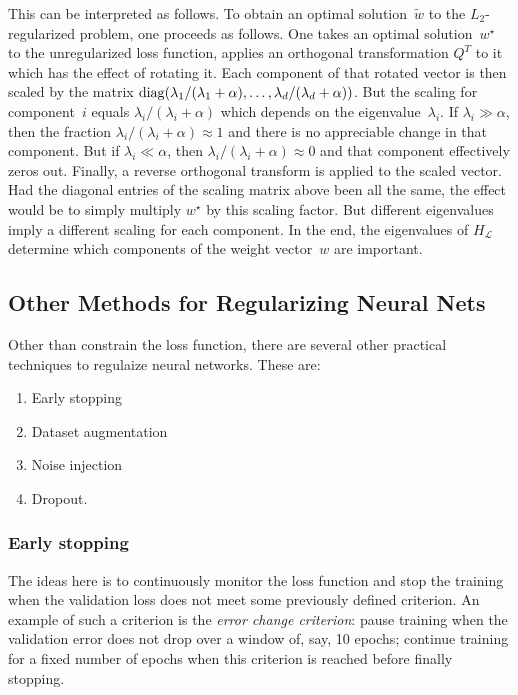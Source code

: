 This can be interpreted as follows. To obtain an optimal solution~$\tilde{w}$ to 
the $L_2$-regularized problem, one proceeds as follows. One takes an optimal solution~$w^{\star}$ 
to the unregularized loss function, applies an orthogonal transformation $Q^{T}$ 
to it which has the effect of rotating it. Each component of that rotated vector 
is then scaled by the matrix 
$\operatorname{diag}(\lambda_1 / (\lambda_1 + \alpha), \ldots, \lambda_d / (\lambda_d + \alpha))$. But 
the scaling for component~$i$ equals $\lambda_i / (\lambda_i + \alpha)$ which 
depends on the eigenvalue~$\lambda_i$. If $\lambda_i \gg \alpha$, then the 
fraction $\lambda_i / (\lambda_i + \alpha) \approx 1$ and there 
is no appreciable change in that component. But if $\lambda_i \ll \alpha$, then 
$\lambda_i / (\lambda_i + \alpha) \approx 0$ and that component effectively zeros 
out. Finally, a reverse orthogonal transform is applied to the scaled 
vector. Had the diagonal entries of the scaling matrix above been all the same, 
the effect would be to simply multiply $w^{\star}$ by this scaling factor. But 
different eigenvalues imply a different scaling for each component. 
In the end, the eigenvalues of $H_{\mathscr{L}}$ determine which components 
of the weight vector~$w$ are important.

\subsection{Other Methods for Regularizing Neural Nets}
Other than constrain the loss function, there are several other practical techniques
to regulaize neural networks. These are:
\begin{enumerate}
    \item Early stopping
    \item Dataset augmentation
    \item Noise injection
    \item Dropout.
\end{enumerate}

\subsubsection{Early stopping}
The ideas here is to continuously monitor the loss function and stop the training
when the validation loss does not meet some previously defined criterion. An 
example of such a criterion is the \emph{error change criterion}: pause 
training when the validation error does not drop over a window of, say, 10 epochs; 
continue training for a fixed number of epochs when this criterion is reached 
before finally stopping. 

